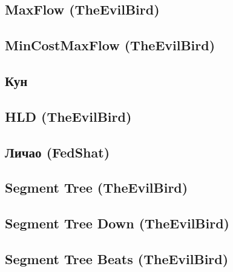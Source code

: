 \documentclass[a4paper]{article}
\begin{document}
\begin{multicols*}{2}
        \subsection{MaxFlow (TheEvilBird)}
            
                
        \subsection{MinCostMaxFlow (TheEvilBird)}
            
            
        \subsection{Кун}
            
        
        \subsection{HLD (TheEvilBird)}
            
        
        \subsection{Личао (FedShat)}
            
            
        \subsection{Segment Tree (TheEvilBird)}
            
        
        \subsection{Segment Tree Down (TheEvilBird)}
            
        
        \subsection{Segment Tree Beats (TheEvilBird)}
            
        

\end{multicols*}
\end{document}

